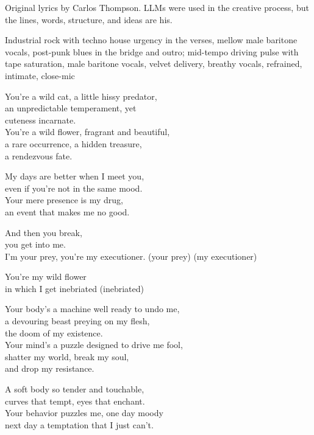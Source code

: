 
\label{sec:wild-cat}
\begin{notes}
Original lyrics by Carlos Thompson. LLMs were used in the creative process, but the lines, words, structure, and ideas are his.
\end{notes}
\begin{style}
Industrial rock with techno house urgency in the verses, mellow male baritone vocals, post-punk blues in the bridge and outro; mid-tempo driving pulse with tape saturation, male baritone vocals, velvet delivery, breathy vocals, refrained, intimate, close-mic
\end{style}
\begin{lyrics}
You’re a wild cat, a little hissy predator,\\
an unpredictable temperament, yet\\
cuteness incarnate.\\
You’re a wild flower, fragrant and beautiful,\\
a rare occurrence, a hidden treasure,\\
a rendezvous fate.

My days are better when I meet you,\\
even if you’re not in the same mood.\\
Your mere presence is my drug,\\
an event that makes me no good.

And then you break,\\
you get into me.\\
I’m your prey, you’re my executioner.
(your prey)
(my executioner)

You’re my wild flower\\
in which I get inebriated
(inebriated)

Your body’s a machine well ready to undo me,\\
a devouring beast preying on my flesh,\\
the doom of my existence.\\
Your mind’s a puzzle designed to drive me fool,\\
shatter my world, break my soul,\\
and drop my resistance.

A soft body so tender and touchable,\\
curves that tempt, eyes that enchant.\\
Your behavior puzzles me, one day moody\\
next day a temptation that I just can’t.


\end{lyrics}
